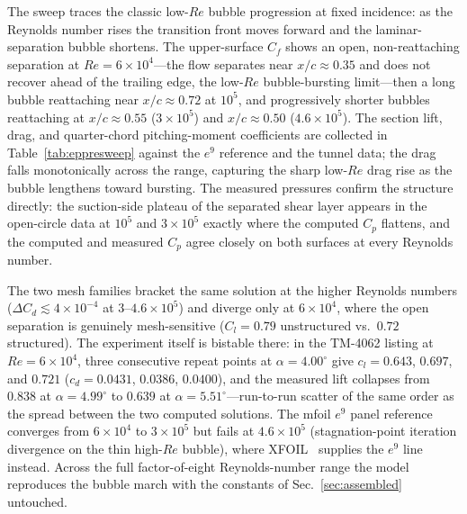 \documentclass[journal]{new-aiaa}
\begin{document}
The sweep traces the classic low-$Re$ bubble progression at fixed incidence: as
the Reynolds number rises the transition front moves forward and the
laminar-separation bubble shortens. The upper-surface $C_f$ shows an open,
non-reattaching separation at $Re\!=\!6\!\times\!10^4$---the flow separates near
$x/c\!\approx\!0.35$ and does not recover ahead of the trailing edge, the
low-$Re$ bubble-bursting limit---then a long bubble reattaching near
$x/c\!\approx\!0.72$ at $10^5$, and progressively shorter bubbles reattaching at
$x/c\!\approx\!0.55$ ($3\!\times\!10^5$) and $x/c\!\approx\!0.50$
($4.6\!\times\!10^5$). The section lift, drag, and quarter-chord pitching-moment
coefficients are collected in Table~\ref{tab:eppresweep} against the $e^9$
reference and the tunnel data; the drag falls monotonically across the range,
capturing the sharp low-$Re$ drag rise as the bubble lengthens toward
bursting. The measured
pressures confirm the structure directly: the suction-side plateau of the
separated shear layer appears in the open-circle data at $10^5$ and
$3\!\times\!10^5$ exactly where the computed $C_p$ flattens, and the computed and
measured $C_p$ agree closely on both surfaces at every Reynolds number.

The two mesh families bracket the same solution at the higher
Reynolds numbers ($\Delta C_d\!\lesssim\!4\!\times\!10^{-4}$ at
$3$--$4.6\!\times\!10^5$) and diverge only at $6\!\times\!10^4$, where the open
separation is genuinely mesh-sensitive ($C_l\!=\!0.79$ unstructured vs.\ $0.72$
structured). The experiment itself is bistable there: in the TM-4062 listing at
$Re\!=\!6\!\times\!10^4$, three consecutive repeat points at
$\alpha\!=\!4.00^\circ$ give $c_l\!=\!0.643$, $0.697$, and $0.721$
($c_d\!=\!0.0431$, $0.0386$, $0.0400$), and the measured lift collapses from
$0.838$ at $\alpha\!=\!4.99^\circ$ to $0.639$ at
$\alpha\!=\!5.51^\circ$---run-to-run scatter of the same order as the spread
between the two computed solutions. The mfoil $e^9$ panel reference converges from
$6\!\times\!10^4$ to $3\!\times\!10^5$ but fails at $4.6\!\times\!10^5$
(stagnation-point iteration divergence on the thin high-$Re$ bubble), where
XFOIL~\cite{drela_xfoil_1989} supplies the $e^9$ line
instead. Across the full factor-of-eight Reynolds-number range the model
reproduces the bubble march with the constants of Sec.~\ref{sec:assembled}
untouched.
\end{document}

